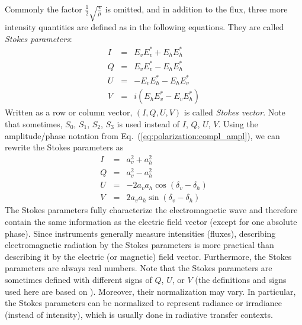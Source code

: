 Commonly the factor  $\frac{1}{2}\sqrt{\frac{\epsilon}{\mu}}$ is
omitted, and in addition to the flux, three more intensity quantities
are defined as in the following equations. They are called 
\emph{Stokes parameters}:
\begin{eqnarray}
  \label{eq:polarization:stokesparam_I}
  I &=&   E_v E_v^\ast + E_h E_h^\ast \\
  \label{eq:polarization:stokesparam_Q}
  Q &=&   E_v E_v^\ast - E_h E_h^\ast \\
  \label{eq:polarization:stokesparam_U}
  U &=& - E_v E_h^\ast - E_h E_v^\ast \\
  \label{eq:polarization:stokesparam_V}
  V &=& i(E_h E_v^\ast - E_v E_h^\ast)
\end{eqnarray}
Written as a row or column vector, $(I,Q,U,V)$ is called
\emph{Stokes vector}. Note that sometimes, $S_0$, $S_1$, $S_2$, $S_3$
is used instead of $I$, $Q$, $U$, $V$.
Using the amplitude/phase notation from
Eq.~(\ref{eq:polarization:compl_ampl}),
we can rewrite the Stokes parameters as 
\begin{eqnarray}
  \label{eq:polarization:stokesparam_alt_I}
 I &=& a_v^2 + a_h^2\\
  \label{eq:polarization:stokesparam_alt_Q}
 Q &=& a_v^2 - a_h^2\\
  \label{eq:polarization:stokesparam_alt_U}
 U &=&  - 2 a_v a_h \cos(\delta_v-\delta_h)\\
  \label{eq:polarization:stokesparam_alt_V}
 V &=&   2 a_v a_h \sin(\delta_v-\delta_h)
\end{eqnarray}
The Stokes parameters fully characterize the electromagnetic wave and
therefore contain the same information as the electric field vector
(except for one absolute phase).  Since instruments generally measure
intensities (fluxes), describing electromagnetic radiation by the
Stokes parameters is more practical than describing it by the electric
(or magnetic) field vector. Furthermore, the Stokes parameters are
always real numbers.  Note that the Stokes parameters are sometimes
defined with different signs of $Q$, $U$, or $V$ (the definitions and
signs used here are based on
\citet{mishchenko00:_light_scatt_nonsp_partic}). Moreover, their
normalization may vary. In particular, the Stokes parameters can be
normalized to represent radiance or irradiance (instead of intensity),
which is usually done in radiative transfer contexts.
 
